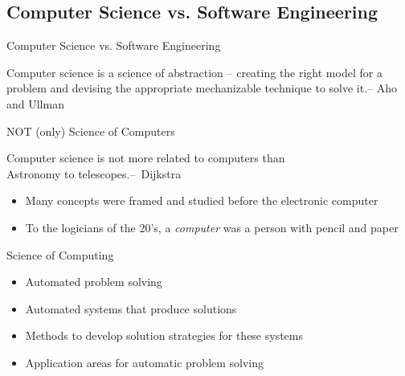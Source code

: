 \subsection{Computer Science vs. Software Engineering}
\begin{frame}{Computer Science vs. Software Engineering}
  \begin{boitequote}{}
    \alert{Computer science} is a science of abstraction – creating the right
    model for a problem and devising the appropriate mechanizable
    technique to solve it.\hfill -- {\rm Aho and Ullman}
  \end{boitequote}\bigskip

  \begin{block}{NOT (only) Science of Computers}\medskip
    \begin{boitequote}{}
      Computer science is not more related to computers than\\
      Astronomy to telescopes.\hfill--~{\rm Dijkstra}
    \end{boitequote}
      
    \begin{itemize}
    \item Many concepts were framed and studied before the electronic computer
    \item To the logicians of the 20's, a \textit{computer} was a person with
      pencil and paper
    \end{itemize}
  \end{block}

  \begin{block}{Science of Computing}
    \begin{itemize}
    \item Automated problem solving
    \item Automated systems that produce solutions
    \item Methods to develop solution strategies for these systems
    \item Application areas for automatic problem solving
    \end{itemize}
  \end{block}
\end{frame}
